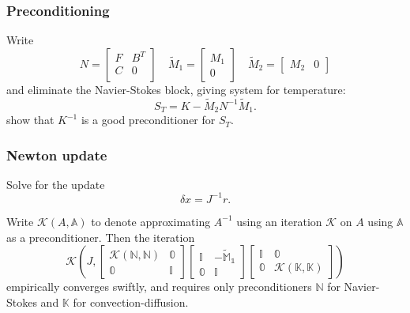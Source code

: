 \documentclass[presentation]{beamer}
\newcommand{\KSP}[2]{\ensuremath{\mathcal{K}\left(#1, \mathbb{#2}\right)}}
\newcommand{\ksp}[1]{\KSP{#1}{#1}}
\begin{document}
\begin{frame}
  \frametitle{Preconditioning}
  Write
  \begin{equation*}
    N = \begin{bmatrix}
      F & B^T\\
      C & 0 \\
    \end{bmatrix} \quad
    \tilde{M}_1 =
    \begin{bmatrix}
      M_1 \\
      0
    \end{bmatrix} \quad
    \tilde{M}_2 = \begin{bmatrix}
      M_2 & 0
    \end{bmatrix}
  \end{equation*}
  and eliminate the Navier-Stokes block, giving system for temperature:
  \begin{equation*}
    S_T = K - \tilde{M}_2 N^{-1} \tilde{M}_1.
  \end{equation*}
  \textcite{Howle:2012} show that $K^{-1}$ is a good preconditioner for
  $S_T$.
\end{frame}
\begin{frame}
  \frametitle{Newton update}
  Solve for the update
  \begin{equation*}
    \delta x = J^{-1} r.
  \end{equation*}

  Write $\mathcal{K}(A, \mathbb{A})$ to denote approximating $A^{-1}$
  using an iteration $\mathcal{K}$ on $A$ using $\mathbb{A}$ as a
  preconditioner.  Then the iteration
  \begin{equation*}
    \KSP{J}{\begin{bmatrix}
      \ksp{N} & 0 \\
      0 & I
    \end{bmatrix}
    \begin{bmatrix}
      I & -\tilde{M}_1 \\
      0 & I
    \end{bmatrix}
    \begin{bmatrix}
      I & 0\\
      0 & \ksp{K}
    \end{bmatrix}}
  \end{equation*}
  empirically converges swiftly, and
  requires only preconditioners $\mathbb{N}$ for Navier-Stokes and
  $\mathbb{K}$ for convection-diffusion.
\end{frame}
\end{document}
